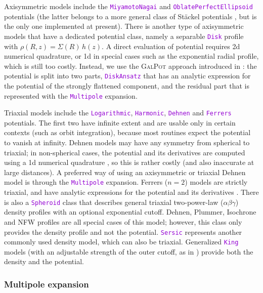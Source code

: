 \documentclass[12pt]{article}
\newcommand{\ttt}[1]{\textcolor{darkviolet}{\texttt{#1}}}
\begin{document}
Axisymmetric models include the \ttt{MiyamotoNagai} and \ttt{OblatePerfectEllipsoid} potentials (the latter belongs to a more general class of St\"ackel potentials \cite{deZeeuw1985}, but is the only one implemented at present).
There is another type of axisymmetric models that have a dedicated potential class, namely a separable \ttt{Disk} profile with $\rho(R,z) = \Sigma(R)\, h(z)$. A direct evaluation of potential requires 2d numerical quadrature, or 1d in special cases such as the exponential radial profile, which is still too costly. Instead, we use the \textsc{GalPot} approach introduced in \cite{KuijkenDubinski1995, DehnenBinney1998}: the potential is split into two parts, \ttt{DiskAnsatz} that has an analytic expression for the potential of the strongly flattened component, and the residual part that is represented with the \ttt{Multipole} expansion.

Triaxial models include the \ttt{Logarithmic}, \ttt{Harmonic}, \ttt{Dehnen} \cite{Dehnen1993} and \ttt{Ferrers} potentials. The first two have infinite extent and are usable only in certain contexts (such as orbit integration), because most routines expect the potential to vanish at infinity.
Dehnen models may have any symmetry from spherical to triaxial; in non-spherical cases, the potential and its derivatives are computed using a 1d numerical quadrature \cite{MerrittFridman1996}, so this is rather costly (and also inaccurate at large distances). A preferred way of using an axisymmetric or triaxial Dehnen model is through the \ttt{Multipole} expansion. Ferrers ($n=2$) models are strictly triaxial, and have analytic expressions for the potential and its derivatives \cite{Pfenniger1984}.
There is also a \ttt{Spheroid} class that describes general triaxial two-power-law ($\alpha\beta\gamma$) density profiles \cite{Zhao1996} with an optional exponential cutoff. Dehnen, Plummer, Isochrone and NFW profiles are all special cases of this model; however, this class only provides the density profile and not the potential. \ttt{Sersic} represents another commonly used density model, which can also be triaxial. 
Generalized \ttt{King} models (with an adjustable strength of the outer cutoff, as in \cite{GielesZocchi2015}) provide both the density and the potential.


\subsubsection{Multipole expansion}  \label{sec:PotentialMultipole}
\end{document}
